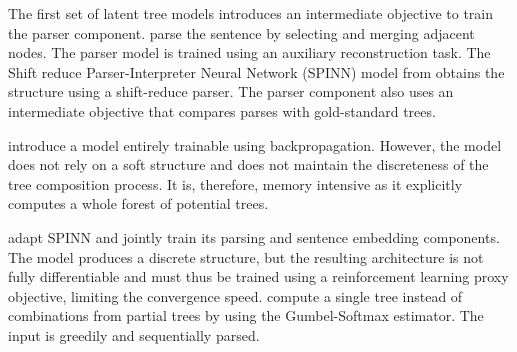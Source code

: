 
The first set of latent tree models introduces an intermediate objective to train the parser component. \textcite{socher_11c} parse the sentence by selecting and merging adjacent nodes. The parser model is trained using an auxiliary reconstruction task. The Shift reduce Parser-Interpreter Neural Network (SPINN) model from \textcite{bowman_16} obtains the structure using a shift-reduce parser. The parser component also uses an intermediate objective that compares parses with gold-standard trees.

\textcite{maillard_19} introduce a model entirely trainable using backpropagation. However, the model does not rely on a soft structure and does not maintain the discreteness of the tree composition process. It is, therefore, memory intensive as it explicitly computes a whole forest of 
potential trees. 

\textcite{yogatama_17} adapt \textsc{SPINN} and jointly train its parsing and sentence embedding components. The model produces a discrete structure, but the resulting architecture is not fully differentiable and must thus be trained using a reinforcement learning proxy objective, limiting the convergence speed. \textcite{choi_18} compute a single tree instead of combinations from partial trees by using the Gumbel-Softmax estimator. The input is greedily and sequentially parsed.






